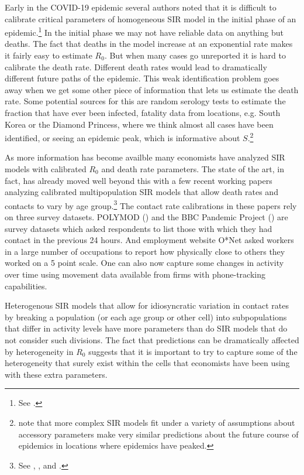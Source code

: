 \documentclass[11pt]{article}
\begin{document}
Early in the COVID-19 epidemic several authors noted that it is difficult to calibrate critical parameters of homogeneous SIR model in 
the initial phase of an epidemic.\footnote{See \citet{atkeson2020deadly,fernandez2020estimating, korolev2020identification, stock2020coronavirus}.} 
In the initial phase we may not have reliable data on anything but deaths. The fact that deaths in the model increase at an exponential rate makes it fairly easy to estimate $R_0$. But when many cases go unreported it is hard to calibrate the death rate. Different death rates would lead to dramatically different future paths of the 
epidemic. This weak identification problem goes away when we get some other piece of information that lets us estimate the death rate. Some potential
sources for this are random serology tests to estimate the fraction that have ever been infected, 
fatality data from locations, e.g. South Korea or the Diamond Princess, where we think almost all 
cases have been identified, or seeing an epidemic peak, which is informative about $S$.\footnote{ \citet{fernandez2020estimating} note that more complex SIR models fit under a variety 
of assumptions about accessory parameters make very similar predictions about the future course of epidemics in locations where epidemics 
have peaked.} 

As more information has become availble many economists have analyzed SIR models with calibrated $R_0$ and
death rate parameters. The state of the art, in fact, has already moved well beyond this with a few recent working papers analyzing calibrated multipopulation SIR models that allow death rates and contacts to vary by age group.\footnote{See \citet{acemoglu2020multi}, \citet{baqaee2020reopening}, and \citet{favero2020restarting}.} 
The contact rate calibrations in these papers rely on three survey
datasets. POLYMOD (\citet{mossong2008social}) and the BBC Pandemic Project (\citet{klepac2020contacts}) are survey datasets which asked respondents to list those with which they had contact in the previous 
24 hours. And employment website O*Net asked workers in a large number of occupations to report how physically close to others they worked on a 5 point scale. One can also now capture some changes in activity over time using movement data available from firms with phone-tracking capabilities.

Heterogenous SIR models that allow for idiosyncratic variation in contact rates by breaking a population (or each age group or other cell) into subpopulations that differ in activity levels have more parameters than do SIR models that do not consider such divisions.
The fact that predictions can be dramatically affected by heterogeneity in $R_0$ suggests that it is important to try to capture some of the heterogeneity that surely exist within the cells that economists have been using with these extra parameters. 
\end{document}
